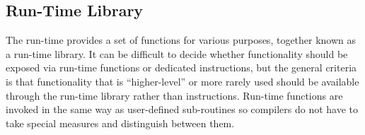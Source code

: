 \subsection{Run-Time Library}

The \thename{} run-time provides a set of functions for various purposes,
together known as a run-time library. It can be difficult to decide whether
functionality should be exposed via run-time functions or dedicated
instructions, but the general criteria is that functionality that is
``higher-level'' or more rarely used should be available through the run-time
library rather than instructions. Run-time functions are invoked in the same way
as user-defined sub-routines so compilers do not have to take special measures
and distinguish between them.


